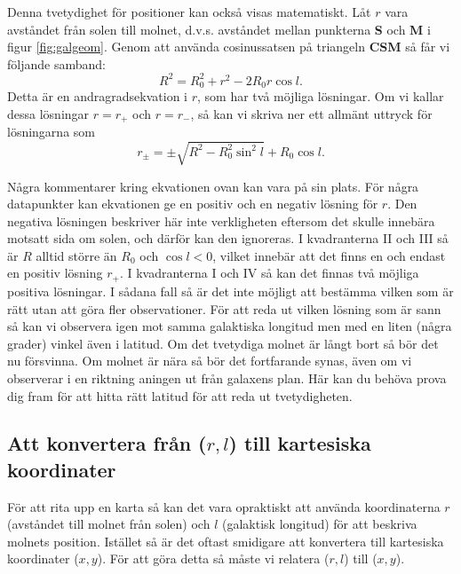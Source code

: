 Denna tvetydighet för positioner kan också visas matematiskt. Låt $r$ vara 
avståndet från solen till molnet, d.v.s. avståndet mellan punkterna {\bf
S} och {\bf M} i  figur \ref{fig:galgeom}. Genom att använda cosinussatsen
på triangeln {\bf CSM} så får vi följande samband:
\begin{equation}
R^2 = R_0^2 + r^2 - 2 R_0 r \cos l.
\end{equation}
Detta är en andragradsekvation i $r$, som har två möjliga lösningar. Om vi
kallar dessa lösningar $r=r_{+}$ och $r=r_{-}$, så kan vi skriva ner ett 
allmänt uttryck för lösningarna som 
\begin{equation}
\boxed{
r_\pm = \pm \sqrt{R^2 - R_0^2 \sin^2 l} + R_0\cos l .
}
\label{eqn:rpm}
\end{equation}

Några kommentarer kring ekvationen ovan kan vara på sin plats. För några
datapunkter kan ekvationen ge en positiv och en negativ lösning för $r$.  Den
negativa lösningen beskriver här inte verkligheten eftersom det skulle innebära
motsatt sida om solen, och därför kan den ignoreras.  I kvadranterna
II och III så är $R$ alltid större än $R_0$ och $\cos l <0$, vilket innebär att
det finns en och endast en positiv lösning $r_+$.  I kvadranterna I och IV så
kan det finnas två möjliga positiva lösningar.  I sådana fall så är det inte
möjligt att bestämma vilken som är rätt utan att göra fler observationer. För
att reda ut vilken lösning som är sann så kan vi observera igen mot samma
galaktiska longitud men med en liten (några grader) vinkel även i latitud. Om
det tvetydiga molnet är långt bort så bör det nu försvinna. Om molnet är nära
så bör det fortfarande synas, även om vi observerar i en riktning aningen ut
från galaxens plan. Här kan du behöva prova dig fram för att hitta rätt latitud
för att reda ut tvetydigheten. 

\subsection{Att konvertera från ($r,l$) till kartesiska koordinater} 
För att rita upp en karta så kan det vara opraktiskt att använda koordinaterna
$r$ (avståndet till molnet från solen) och $l$ (galaktisk longitud) för att beskriva
molnets position. Istället så är det oftast smidigare att konvertera till kartesiska koordinater
($x,y$). För att göra detta så måste vi relatera ($r, l$) till ($x, y$). 


